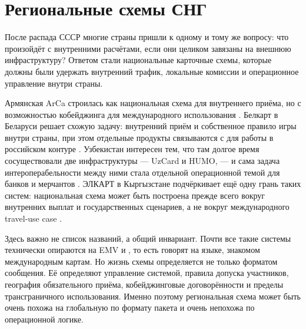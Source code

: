 \section{Региональные схемы СНГ}
\label{sec:cis-payment-systems}

После распада СССР многие страны пришли к одному и тому же вопросу:
что произойдёт с внутренними расчётами, если они целиком завязаны
на внешнюю инфраструктуру? Ответом стали национальные карточные
схемы, которые должны были удержать внутренний трафик, локальные
комиссии и операционное управление внутри страны.

Армянская ArCa строилась как национальная схема для внутреннего
приёма, но с возможностью кобейджинга для международного
использования .
Белкарт в Беларуси решает схожую задачу: внутренний приём
и собственное правило игры внутри страны, при этом отдельные продукты
связываются с  для работы в российском
контуре .
Узбекистан интересен тем, что там долгое время сосуществовали
две инфраструктуры — UzCard и HUMO, — и сама задача интероперабельности
между ними стала отдельной операционной темой для банков
и мерчантов .
ЭЛКАРТ в Кыргызстане подчёркивает ещё одну грань таких систем:
национальная схема может быть построена прежде всего вокруг
внутренних выплат и государственных сценариев, а не вокруг
международного travel-use case .


Здесь важно не список названий, а общий инвариант. Почти все такие
системы технически опираются на EMV и , то есть говорят
на языке, знакомом международным картам. Но жизнь схемы определяется
не только форматом сообщения. Её определяют управление системой,
правила допуска участников, география обязательного приёма,
кобейджинговые договорённости и пределы трансграничного использования.
Именно поэтому региональная схема может быть очень похожа на глобальную
по формату пакета и очень непохожа по операционной логике.

